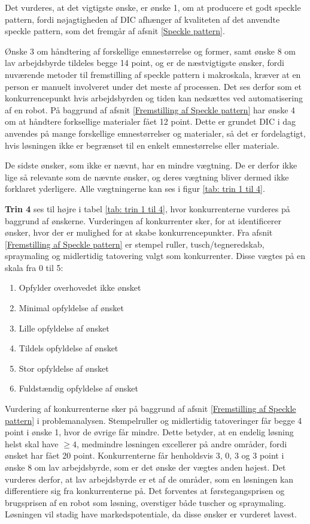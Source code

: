 Det vurderes, at det vigtigste ønske, er ønske 1, om at producere et godt speckle pattern, fordi nøjagtigheden af DIC afhænger af kvaliteten af det anvendte speckle pattern, som det fremgår af afsnit \ref{Speckle pattern}. 

Ønske 3 om håndtering af forskellige emnestørrelse og former, samt ønske 8 om lav arbejdsbyrde tildeles begge 14 point, og er de næstvigtigste ønsker, fordi nuværende metoder til fremstilling af speckle pattern i makroskala, kræver at en person er manuelt involveret under det meste af processen. Det ses derfor som et konkurrencepunkt hvis arbejdsbyrden og tiden kan nedsættes ved automatisering af en robot. På baggrund af afsnit \ref{Fremstilling af Speckle pattern} har ønske 4 om at håndtere forksellige materialer fået 12 point. Dette er grundet DIC i dag anvendes på mange forskellige emnestørrelser og materialer, så det er fordelagtigt, hvis løsningen ikke er begrænset til en enkelt emnestørrelse eller materiale. 

De sidste ønsker, som ikke er nævnt, har en mindre vægtning. De er derfor ikke lige så relevante som de nævnte ønsker, og deres vægtning bliver dermed ikke forklaret yderligere. Alle vægtningerne kan ses i figur \ref{tab: trin 1 til 4}.


\textbf{Trin 4} ses til højre i tabel \ref{tab: trin 1 til 4}, hvor konkurrenterne vurderes på baggrund af ønskerne. Vurderingen af konkurrenter sker, for at identificerer ønsker, hvor der er mulighed for at skabe konkurrencepunkter. Fra afsnit \ref{Fremstilling af Speckle pattern} er stempel ruller, tusch/tegneredskab, spraymaling og midlertidig tatovering valgt som konkurrenter. Disse vægtes på en skala fra 0 til 5: %


\newcommand{\myhash}{\raisebox{\depth}{\#}}
\begin{enumerate}[font=\bfseries]\addtocounter{enumi}{-1}
    \item Opfylder overhovedet ikke ønsket 
    \item Minimal opfyldelse af ønsket 
    \item Lille opfyldelse af ønsket 
    \item Tildels opfyldelse af ønsket 
    \item Stor opfyldelse af ønsket 
    \item Fuldstændig opfyldelse af ønsket 
\end{enumerate}


Vurdering af konkurrenterne sker på baggrund af afsnit \ref{Fremstilling af Speckle pattern} i problemanalysen. Stempelruller og midlertidig tatoveringer får begge 4 point i ønske 1, hvor de øvrige får mindre. Dette betyder, at en endelig løsning helst skal have $\geq 4$, medmindre løsningen excellerer på andre områder, fordi ønsket har fået 20 point. Konkurrenterne får henholdsvis 3, 0, 3 og 3 point i ønske 8 om lav arbejdsbyrde, som er det ønske der vægtes anden højest. Det vurderes derfor, at lav arbejdsbyrde er et af de områder, som en løsningen kan differentiere sig fra konkurrenterne på. Det forventes at førstegangsprisen og brugsprisen af en robot som løsning, overstiger både tuscher og spraymaling. Løsningen vil stadig have markedspotentiale, da disse ønsker er vurderet lavest. 

